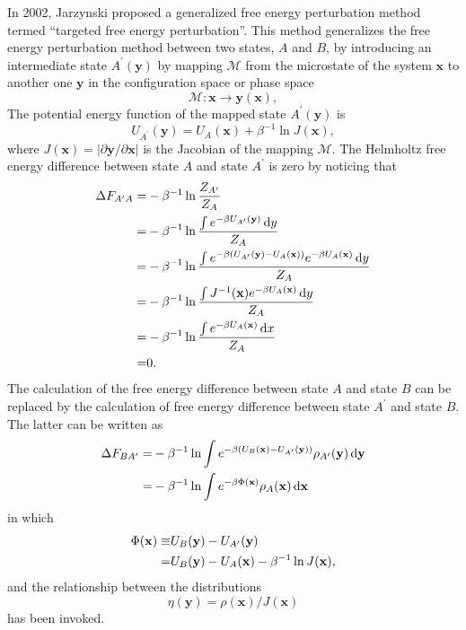 In 2002, Jarzynski proposed a generalized free energy perturbation method termed ``targeted free energy perturbation''.\cite{JarzynskiPRE2002} This method generalizes the free energy perturbation method between two states, $A$ and $B$, by introducing an intermediate state $A^\prime(\mathbf{y})$ by mapping $\mathcal{M}$ from the microstate of the system $\mathbf{x}$ to another one $\mathbf{y}$ in the configuration space or phase space
\begin{equation}
	\mathcal{M}: \mathbf{x} \to \mathbf{y}(\mathbf{x}),
\end{equation}
The potential energy function of the mapped state $A^\prime(\mathbf{y})$ is
\begin{equation}
	U_{A^\prime}(\mathbf{y})=U_A(\mathbf{x})+\beta^{-1}\ln J(\mathbf{x}),
\end{equation}
where $J(\mathbf{x})=|\partial \mathbf{y}/\partial \mathbf{x}|$ is the Jacobian of the mapping $\mathcal{M}$. The Helmholtz free energy difference between state $A$ and state $A^\prime$ is zero by noticing that
\begin{align*}
	\Delta F_{A^\prime A}=&-\beta^{-1}\ln\frac{Z_{A^\prime}}{Z_A}\notag\\
	                     =&-\beta^{-1}\ln \frac{\int e^{-\beta U_{A^\prime}(\mathbf{y})}\mathop{}\!\mathrm{d} y}{Z_A}\notag\\
	                     =&-\beta^{-1}\ln \frac{\int e^{-\beta (U_{A^\prime}(\mathbf{y})-U_A(\mathbf{x}))}e^{-\beta U_A(\mathbf{x})}\mathop{}\!\mathrm{d} y}{Z_A}\notag\\
	                     =&-\beta^{-1}\ln \frac{\int J^{-1}(\mathbf{x})e^{-\beta U_A(\mathbf{x})}\mathop{}\!\mathrm{d} y}{Z_A}\notag\\
	                     =&-\beta^{-1}\ln \frac{\int e^{-\beta U_A(\mathbf{x})}\mathop{}\!\mathrm{d} x}{Z_A}\notag\\
	                     =&0.
\end{align*}
The calculation of the free energy difference between state $A$ and state $B$ can be replaced by the calculation of free energy difference between state $A^\prime$ and state $B$. The latter can be written as
\begin{align}
	\Delta F_{BA^\prime}=&-\beta^{-1}\ln {\int e^{-\beta (U_B(\mathbf{x})-U_{A^\prime}(\mathbf{y}))}\rho_{A^\prime}(\mathbf{y})\mathop{}\!\mathrm{d}\mathbf{y}}\notag\\
	                    =&-\beta^{-1}\ln {\int e^{-\beta \Phi(\mathbf{x})}\rho_{A}(\mathbf{x})\mathop{}\!\mathrm{d}\mathbf{x}}
\end{align}
in which 
\begin{align}
	\Phi(\mathbf{x})\equiv& U_B(\mathbf{y}) - U_{A^\prime}(\mathbf{y})\notag\\
	                =&U_B(\mathbf{y})-U_A(\mathbf{x})-\beta^{-1}\ln J(\mathbf{x}),
\end{align}
and the relationship between the distributions
\begin{equation}
	\eta(\mathbf{y})=\rho(\mathbf{x})/J(\mathbf{x})
	\label{Eq:FEM:TP:TFEPdistribution}
\end{equation}
has been invoked.

